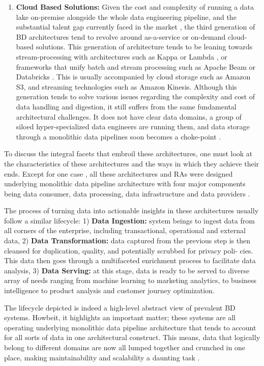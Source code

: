 \documentclass[review]{elsarticle}
\begin{document}
\begin{enumerate}
    \item \textbf{Cloud Based Solutions:} Given the cost and complexity of running a data lake on-premise alongside the whole data engineering pipeline, and the substantial talent gap currently faced in the market \cite{AtaeiHype}, the third generation of BD architectures tend to revolve around as-a-service or on-demand cloud-based solutions. This generation of architecture tends to be leaning towards stream-processing with architectures such as Kappa or Lambda \cite{lin2017lambda}, or frameworks that unify batch and stream processing such as Apache Beam \cite{ApachBeam} or Databricks \cite{DataBricks}. This is usually accompanied by cloud storage such as Amazon S3, and streaming technologies such as Amazon Kinesis. Although this generation tends to solve various issues regarding the complexity and cost of data handling and digestion, it still suffers from the same fundamental architectural challenges. It does not have clear data domains, a group of siloed hyper-specialized data engineers are running them, and data storage through a monolithic data pipelines soon becomes a choke-point \cite{AtaeiACIS, ataei2023application}.
\end{enumerate}

To discuss the integral facets that embroil these architectures, one must look at the characteristics of these architectures and the ways in which they achieve their ends. Except for one case \cite{AtaeiApsec}, all these architectures and RAs were designed underlying monolithic data pipeline architecture with four major components being data consumer, data processing, data infrastructure and data providers \cite{ataei2022state}.

The process of turning data into actionable insights in these architectures usually follow a similar lifecycle: 1) \textbf{Data Ingestion:} system beings to ingest data from all corners of the enterprise, including transactional, operational and external data, 2) \textbf{Data Transformation:} data captured from the previous step is then
cleansed for duplication, quality, and potentially scrubbed for privacy poli-
cies. This data then goes through a multifaceted enrichment process to  facilitate data analysis, 3) \textbf{Data Serving:} at this stage, data is ready to be served to diverse array of needs ranging from machine learning to marketing analytics, to business intelligence to product analysis and customer journey optimization.

The lifecycle depicted is indeed a high-level abstract view of prevalent BD systems. Howbeit, it highlights an important matter; these systems are all operating underlying monolithic data pipeline architecture that tends to account for all sorts of data in one architectural construct. This means, data that logically belong to different domains are now all lumped together and crunched in one place, making maintainability and scalability a daunting task \cite{monolithToMesh}.
\end{document}
